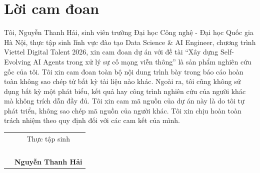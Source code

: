 \chapter*{Lời cam đoan}

Tôi, Nguyễn Thanh Hải, sinh viên trường Đại học Công nghệ - Đại học Quốc gia Hà Nội, thực tập sinh lĩnh vực đào tạo Data Science \& AI Engineer, chương trình Viettel Digital Talent 2026, xin cam đoan dự án với đề tài ``Xây dựng Self-Evolving AI Agents trong xử lý sự cố mạng viễn thông'' là sản phẩm nghiên cứu gốc của tôi. Tôi xin cam đoan toàn bộ nội dung trình bày trong báo cáo hoàn toàn không sao chép từ bất kỳ tài liệu nào khác. Ngoài ra, tôi cũng không sử dụng bất kỳ một phát biểu, kết quả hay công trình nghiên cứu của người khác mà không trích dẫn đầy đủ. Tôi xin cam mã nguồn của dự án này là do tôi tự phát triển, không sao chép mã nguồn của người khác. Tôi xin chịu hoàn toàn trách nhiệm theo quy định đối với các cam kết của mình.

\begin{table}[h]
\begin{tabular}{p{}c}
\\
 & Thực tập sinh \\
 &              \\
 &              \\
 &              \\
  &              \\
 & \textbf{Nguyễn Thanh Hải} 
\end{tabular}
\end{table}
